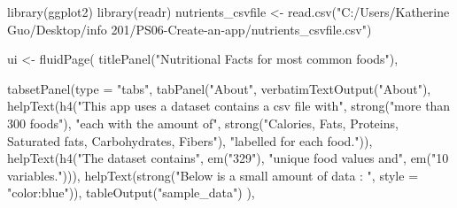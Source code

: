 \documentclass[
]{article}
\newenvironment{Shaded}{\begin{snugshade}}{\end{snugshade}}
\newcommand{\AttributeTok}[1]{\textcolor[rgb]{0.77,0.63,0.00}{#1}}
\newcommand{\FunctionTok}[1]{\textcolor[rgb]{0.00,0.00,0.00}{#1}}
\newcommand{\NormalTok}[1]{#1}
\newcommand{\OtherTok}[1]{\textcolor[rgb]{0.56,0.35,0.01}{#1}}
\newcommand{\StringTok}[1]{\textcolor[rgb]{0.31,0.60,0.02}{#1}}
\begin{document}
\begin{Shaded}
\begin{Highlighting}[]
\FunctionTok{library}\NormalTok{(ggplot2)}
\FunctionTok{library}\NormalTok{(readr)}
\NormalTok{nutrients\_csvfile }\OtherTok{\textless{}{-}} \FunctionTok{read.csv}\NormalTok{(}\StringTok{"C:/Users/Katherine Guo/Desktop/info 201/PS06{-}Create{-}an{-}app/nutrients\_csvfile.csv"}\NormalTok{)}

\NormalTok{ui }\OtherTok{\textless{}{-}} \FunctionTok{fluidPage}\NormalTok{(}
  \FunctionTok{titlePanel}\NormalTok{(}\StringTok{"Nutritional Facts for most common foods"}\NormalTok{),}
  
  \FunctionTok{tabsetPanel}\NormalTok{(}\AttributeTok{type =} \StringTok{"tabs"}\NormalTok{,}
              \FunctionTok{tabPanel}\NormalTok{(}\StringTok{"About"}\NormalTok{, }\FunctionTok{verbatimTextOutput}\NormalTok{(}\StringTok{"About"}\NormalTok{),}
                       \FunctionTok{helpText}\NormalTok{(}\FunctionTok{h4}\NormalTok{(}\StringTok{"This app uses a dataset contains a csv file with"}\NormalTok{, }\FunctionTok{strong}\NormalTok{(}\StringTok{"more than 300 foods"}\NormalTok{), }\StringTok{"each with the}
\StringTok{                                amount of"}\NormalTok{, }\FunctionTok{strong}\NormalTok{(}\StringTok{"Calories, Fats, Proteins, Saturated fats, Carbohydrates, Fibers"}\NormalTok{), }\StringTok{"labelled for each food."}\NormalTok{)),}
                       \FunctionTok{helpText}\NormalTok{(}\FunctionTok{h4}\NormalTok{(}\StringTok{"The dataset contains"}\NormalTok{, }\FunctionTok{em}\NormalTok{(}\StringTok{"329"}\NormalTok{), }\StringTok{"unique food values and"}\NormalTok{, }\FunctionTok{em}\NormalTok{(}\StringTok{"10 variables."}\NormalTok{))),}
                       \FunctionTok{helpText}\NormalTok{(}\FunctionTok{strong}\NormalTok{(}\StringTok{"Below is a small amount of data : "}\NormalTok{, }\AttributeTok{style =} \StringTok{"color:blue"}\NormalTok{)),}
                       \FunctionTok{tableOutput}\NormalTok{(}\StringTok{"sample\_data"}\NormalTok{)}
\NormalTok{              ),}
              

\end{Highlighting}
\end{Shaded}
\end{document}
